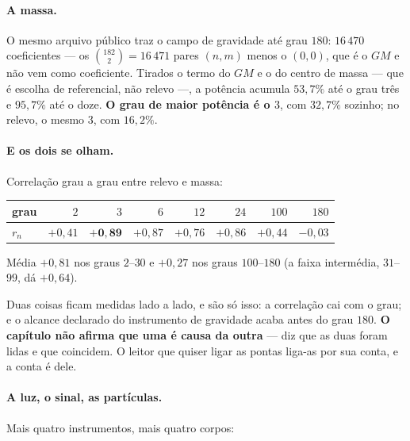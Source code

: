 \documentclass[11pt]{article}
\theoremstyle{plain}
\theoremstyle{remark}
\begin{document}
\paragraph{A massa.} O mesmo arquivo público traz o campo de gravidade até grau
$180$: $16\,470$ coeficientes --- os $\binom{182}{2}=16\,471$ pares $(n,m)$
menos o $(0,0)$, que é o $GM$ e não vem como coeficiente. Tirados o termo do $GM$ e o do centro de massa
--- que é escolha de referencial, não relevo ---, a potência acumula
$53{,}7\%$ até o grau três e $95{,}7\%$ até o doze. \textbf{O grau de maior
potência é o $3$}, com $32{,}7\%$ sozinho; no relevo, o mesmo $3$, com
$16{,}2\%$.

\paragraph{E os dois se olham.} Correlação grau a grau entre relevo e massa:

\begin{center}
\begin{tabular}{@{}lrrrrrrr@{}}
\toprule
grau & $2$ & $3$ & $6$ & $12$ & $24$ & $100$ & $180$ \\
\midrule
$r_n$ & $+0{,}41$ & $\mathbf{+0{,}89}$ & $+0{,}87$ & $+0{,}76$ & $+0{,}86$ & $+0{,}44$ & $-0{,}03$ \\
\bottomrule
\end{tabular}
\end{center}

\noindent Média $+0{,}81$ nos graus $2$--$30$ e $+0{,}27$ nos graus
$100$--$180$ (a faixa intermédia, $31$--$99$, dá $+0{,}64$).

\medskip
\noindent Duas coisas ficam medidas lado a lado, e são só isso: a correlação
cai com o grau; e o alcance declarado do instrumento de gravidade acaba antes
do grau $180$. \textbf{O capítulo não afirma que uma é causa da outra} --- diz
que as duas foram lidas e que coincidem. O leitor que quiser ligar as pontas
liga-as por sua conta, e a conta é dele.

\paragraph{A luz, o sinal, as partículas.} Mais quatro instrumentos, mais
quatro corpos:
\end{document}
